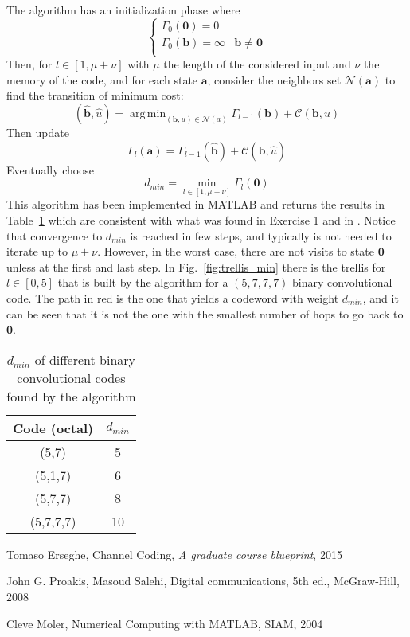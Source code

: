 \documentclass[10pt]{article}
\DeclareMathOperator*{\argmin}{arg\,min}
\begin{document}
The algorithm has an initialization phase where 
\begin{equation}
\begin{cases}
	\Gamma_0(\mathbf{0}) = 0 \\
	\Gamma_0(\mathbf{b}) = \infty & \mathbf{b} \ne \mathbf{0} \\

\end{cases}
\end{equation}	
Then, for $l \in [1, \mu + \nu]$ with $\mu$ the length of the considered input and $\nu$ the memory of the code, and for each state $\mathbf{a}$, consider the neighbors set $\mathcal{N}(\mathbf{a})$ to find the transition of minimum cost:
\begin{equation}
	(\mathbf{\hat{b}}, \hat{u}) = \argmin_{(\mathbf{b}, u) \in \mathcal{N}(a)} \Gamma_{l-1}(\mathbf{b}) + \mathcal{C}(\mathbf{b}, u)
\end{equation}
Then update 
\begin{equation}
	\Gamma_{l}(\mathbf{a}) = \Gamma_{l-1}(\mathbf{\hat{b}}) + \mathcal{C}(\mathbf{\hat{b}}, \hat{u})
\end{equation}
Eventually choose 
\begin{equation}
	d_{min} = \min_{l \in [1, \mu + \nu]} \Gamma_l(\mathbf{0})
\end{equation}
This algorithm has been implemented in MATLAB and returns the results in Table~\ref{table:dmin} which are consistent with what was found in Exercise 1 and in \cite{proakis}. Notice that convergence to $d_{min}$ is reached in few steps, and typically is not needed to iterate up to $\mu + \nu$. However, in the worst case, there are not visits to state $\mathbf{0}$ unless at the first and last step. In Fig.~\ref{fig:trellis_min} there is the trellis for $l\in[0,5]$ that is built by the algorithm for a $(5,7,7,7)$ binary convolutional code. The path in red is the one that yields a codeword with weight $d_{min}$, and it can be seen that it is not the one with the smallest number of hops to go back to $\mathbf{0}$.

\begin{table}[h]
	\centering
	\begin{tabular}{c|c}
		\toprule
		Code (octal) & $d_{min}$ \\
		\midrule
		(5,7) & 5 \\
		(5,1,7) & 6 \\
		(5,7,7) & 8 \\
		(5,7,7,7) & 10 \\
	\end{tabular}
	\caption{$d_{min}$ of different binary convolutional codes found by the algorithm}
	\label{table:dmin}
\end{table}

\begin{thebibliography}{10}

 Tomaso Erseghe, Channel Coding, \emph{A graduate course blueprint}, 2015

 John G. Proakis, Masoud Salehi, Digital communications, 5th ed., McGraw-Hill, 2008

 Cleve Moler, Numerical Computing with MATLAB, SIAM, 2004

\end{thebibliography}
\end{document}
